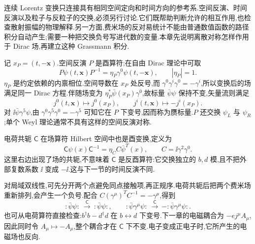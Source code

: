 \label{ch:fermion-path}

连续 Lorentz 变换只连接具有相同空间定向和时间方向的参考系.空间反演、时间反演以及粒子与反粒子的交换,必须另行讨论.它们既帮助判断允许的相互作用,也检查散射振幅的物理解释.另一方面,费米场的反对易统计不能由普通数值函数的路径积分自动产生;需要一种把交换负号写进代数的变量.本章先说明离散对称怎样作用于 Dirac 场,再建立这种 Grassmann 积分.


记 $x_P=(t,-\mathbf x)$.空间反演 $P$ 是酉算符;在自由 Dirac 理论中可取
\begin{equation}
 P\psi(t,\mathbf x)P^{-1}=\eta_P\gamma^0\psi(t,-\mathbf x),
 \qquad |\eta_P|=1.
 \label{eq:parity-spinor}
\end{equation}
$\eta_P$ 是约定依赖的内禀相位.空间导数在 $x_P$ 处反号,而 $\gamma^0\gamma^i\gamma^0=-\gamma^i$,所以变换后的场满足同一 Dirac 方程.伴随场变为 $\eta_P^*\bar\psi(x_P)\gamma^0$,故标量 $\bar\psi\psi$ 保持不变,矢量流则满足
\begin{equation}
 j^0(t,\mathbf x)\mapsto j^0(x_P),
 \qquad j^i(t,\mathbf x)\mapsto-j^i(x_P).
\end{equation}
对 $\ii\bar\psi\gamma^5\psi$,由 $\gamma^0\gamma^5\gamma^0=-\gamma^5$ 可知它在 $P$ 下变号,因而称为赝标量.$P$ 还交换 $\psi_L$ 与 $\psi_R$;单个 Weyl 理论通常不具有这样的空间反演对称.

电荷共轭 $\mathsf C$ 在场算符 Hilbert 空间中也是酉变换,定义为
\begin{equation}
 \mathsf C\psi(x)\mathsf C^{-1}=\eta_C C\bar\psi^T(x),
 \qquad C=\ii\gamma^2\gamma^0.
\end{equation}
这里右边出现了场的共轭,不意味着 $\mathsf C$ 是反酉算符:它交换独立的 $b,d$ 模,且不把外部复数系数 $\ii$ 变成 $-\ii$.这与下一节的时间反演不同.

对局域双线性,可先分开两个点避免同点接触项,再正规序.电荷共轭后把两个费米场重新排列,会产生一个负号.配合 $C(\gamma^\mu)^TC^{-1}=-\gamma^\mu$,得到
\begin{equation}
 :\bar\psi\psi:\ \xrightarrow{\mathsf C}\ :\bar\psi\psi:,
 \qquad :\bar\psi\gamma^\mu\psi:\ \xrightarrow{\mathsf C}\ -:\bar\psi\gamma^\mu\psi:.
\end{equation}
也可从电荷算符直接检查:$b^\dagger b-d^\dagger d$ 在 $b\leftrightarrow d$ 下变号.下一章的电磁耦合为 $-e j^\mu A_\mu$,因此同时令 $A_\mu\mapsto-A_\mu$,整个耦合才在 $\mathsf C$ 下不变.电子变成正电子时,它所产生的电磁场也反向.


